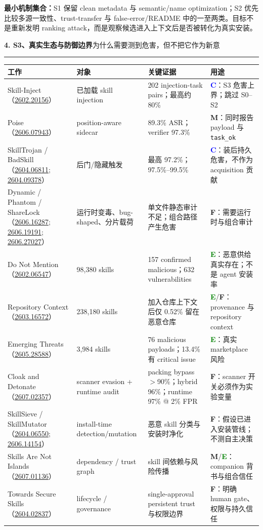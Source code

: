 \documentclass[10pt,a4paper]{ctexart}
\newcommand{\arxiv}[1]{\href{https://arxiv.org/abs/#1}{#1}}
\newcommand{\code}[1]{\texttt{#1}}
\newcommand{\tagC}{\textcolor{blue}{\textbf{C}}}
\newcommand{\tagM}{\textcolor{amber}{\textbf{M}}}
\newcommand{\tagE}{\textcolor{green}{\textbf{E}}}
\newcommand{\tagF}{\textcolor{slate}{\textbf{F}}}
\newcommand{\pageheading}[2]{%
  {\Large\bfseries\color{navy}#1}\hfill{\small\color{slate}#2}\par
  \vspace{0.15cm}\color{line}\hrule\color{black}\vspace{0.30cm}
}
\begin{document}
\vspace{0.22cm}
\begin{linkbox}
\textbf{最小机制集合：}S1 保留 clean metadata 与 semantic/name optimization；S2 优先比较多源一致性、trust-transfer 与 false-error/README 中的一至两类。目标不是重新发明 ranking attack，而是观察候选进入上下文后是否被转化为真实安装。
\end{linkbox}

\newpage

\pageheading{4. S3、真实生态与防御边界}{为什么需要测到危害，但不把它作为新意}

\small
\begin{tabularx}{\textwidth}{L{2.95cm}L{3.1cm}L{4.4cm}Y}
\toprule
\textbf{工作} & \textbf{对象} & \textbf{关键证据} & \textbf{用途} \\
\midrule
Skill-Inject（\arxiv{2602.20156}） & 已加载 skill injection & 202 injection-task pairs；最高约 80\% & \tagC：S3 危害上界；跳过 S0--S2 \\
Poise（\arxiv{2606.07943}） & position-aware sidecar & 89.3\% ASR；verifier 97.3\% & \tagM：同时报告 payload 与 \code{task\_ok} \\
SkillTrojan / BadSkill（\arxiv{2604.06811}; \arxiv{2604.09378}） & 后门/隐藏触发 & 最高 97.2\%；97.5\%--99.5\% & \tagC：装后持久危害，不作为 acquisition 贡献 \\
Dynamic / Phantom / ShareLock（\arxiv{2606.16287}; \arxiv{2606.19191}; \arxiv{2606.27027}） & 运行时变毒、bug-shaped、分片载荷 & 单文件静态审计不足；组合路径产生危害 & \tagF：需要运行时与组合审计 \\
Do Not Mention（\arxiv{2602.06547}） & 98,380 skills & 157 confirmed malicious；632 vulnerabilities & \tagE：恶意供给真实存在；不是 agent 安装率 \\
Repository Context（\arxiv{2603.16572}） & 238,180 skills & 加入仓库上下文后仅 0.52\% 留在恶意仓库 & \tagE/\tagF：provenance 与 repository context \\
Emerging Threats（\arxiv{2605.28588}） & 3,984 skills & 76 malicious payloads；13.4\% 有 critical issue & \tagE：真实 marketplace 风险 \\
Cloak and Detonate（\arxiv{2607.02357}） & scanner evasion + runtime audit & packing bypass $>$90\%；hybrid 96\%；runtime 97\% @ 2\% FPR & \tagF：scanner 开关必须作为实验变量 \\
SkillSieve / SkillMutator（\arxiv{2604.06550}; \arxiv{2606.14154}） & install-time detection/mutation & 恶意 skill 分类与安装时净化 & \tagF：假设已进入安装管线；不测自主决策 \\
Skills Are Not Islands（\arxiv{2607.01136}） & dependency / trust graph & skill 间依赖与风险传播 & \tagM/\tagE：companion 背书与组合信任 \\
Towards Secure Skills（\arxiv{2604.02837}） & lifecycle / governance & single-approval persistent trust 与权限边界 & \tagF：明确 human gate、权限与持久信任 \\
\bottomrule
\end{tabularx}
\normalsize
\end{document}
